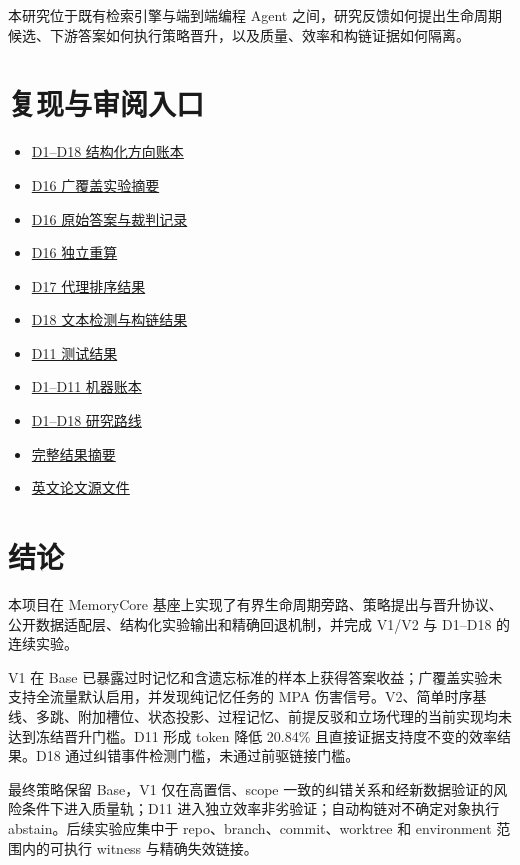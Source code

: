 本研究位于既有检索引擎与端到端编程 Agent 之间，研究反馈如何提出生命周期候选、下游答案如何执行策略晋升，以及质量、效率和构链证据如何隔离。

\section{复现与审阅入口}

\begin{itemize}
\item \href{results/direction-summary.v2.json}{D1--D18 结构化方向账本}
\item \href{results/d16-broad-ablation/e2e/summary.json}{D16 广覆盖实验摘要}
\item \href{results/d16-broad-ablation/e2e/evaluations.jsonl}{D16 原始答案与裁判记录}
\item \href{results/d16-broad-ablation/e2e/independent-validation.json}{D16 独立重算}
\item \href{results/d17-stance-proxy/summary.json}{D17 代理排序结果}
\item \href{results/d18-text-correction/summary.json}{D18 文本检测与构链结果}
\item \href{results/d11-source-evidence/test/summary.json}{D11 测试结果}
\item \href{results/iteration-ledger.v1.json}{D1--D11 机器账本}
\item \href{RESEARCH_ROADMAP.md}{D1--D18 研究路线}
\item \href{RESULTS.md}{完整结果摘要}
\item \href{paper/main.tex}{英文论文源文件}
\end{itemize}

\section{结论}

本项目在 MemoryCore 基座上实现了有界生命周期旁路、策略提出与晋升协议、公开数据适配层、结构化实验输出和精确回退机制，并完成 V1/V2 与 D1--D18 的连续实验。

V1 在 Base 已暴露过时记忆和含遗忘标准的样本上获得答案收益；广覆盖实验未支持全流量默认启用，并发现纯记忆任务的 MPA 伤害信号。V2、简单时序基线、多跳、附加槽位、状态投影、过程记忆、前提反驳和立场代理的当前实现均未达到冻结晋升门槛。D11 形成 token 降低 20.84\% 且直接证据支持度不变的效率结果。D18 通过纠错事件检测门槛，未通过前驱链接门槛。

最终策略保留 Base，V1 仅在高置信、scope 一致的纠错关系和经新数据验证的风险条件下进入质量轨；D11 进入独立效率非劣验证；自动构链对不确定对象执行 abstain。后续实验应集中于 repo、branch、commit、worktree 和 environment 范围内的可执行 witness 与精确失效链接。
